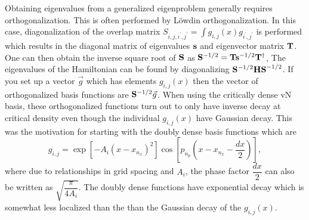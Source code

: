 {   Obtaining eigenvalues from a generalized eigenproblem generally requires orthogonalization. This is often performed by L\"{o}wdin orthogonalization.  In this case, diagonalization of the overlap matrix $S_{i,j,i^{\prime},j^{\prime}}=\int g_{i,j}\left(x\right)g_{i^{\prime},j^{\prime}}$ is performed which results in the diagonal matrix of eigenvalues ${{\bf s}}$ and eigenvector matrix ${{\bf T}}$.  One can then obtain the inverse square root of ${{\bf S}}$ as ${{\bf S}}^{-1/2}={{\bf T}}{{\bf s}}^{-1/2}{{\bf T}}^{\dagger}$, The eigenvalues of the Hamiltonian can be found by diagonalizing ${{\bf S}}^{-1/2}{{\bf HS}}^{-1/2}$.  If you set up a vector $\vec{g}$ which has elements $g_{i,j}\left(x\right)$ then the vector of orthogonalized basis functions are ${{\bf S}}^{-1/2}\vec{g}$.  When using the critically dense vN basis, these orthogonalized functions turn out to only have inverse decay at critical density even though the individual $g_{i,j}\left(x\right)$ have Gaussian decay.  This was the motivation for starting with the doubly dense basis functions which  are
 \begin{equation}\label{eq.psdd}
 g_{i,j}=\exp\left[-A_i\left(x-
x_{n_x}\right)^2\right]\cos\left[p_{n_p}\left(x-x_{n_x}-\dfrac{dx}{2}\right)\right],
 \end{equation} 
 where due to relationships in grid spacing and $A_i$, the phase factor $\dfrac{dx}{2}$ can also be written as $\sqrt{\dfrac{\pi}{4A_i}}$.  The doubly dense functions have exponential decay which is somewhat less localized than the than the Gaussian decay of the $g_{i,j}\left(x\right)$.
 
}
